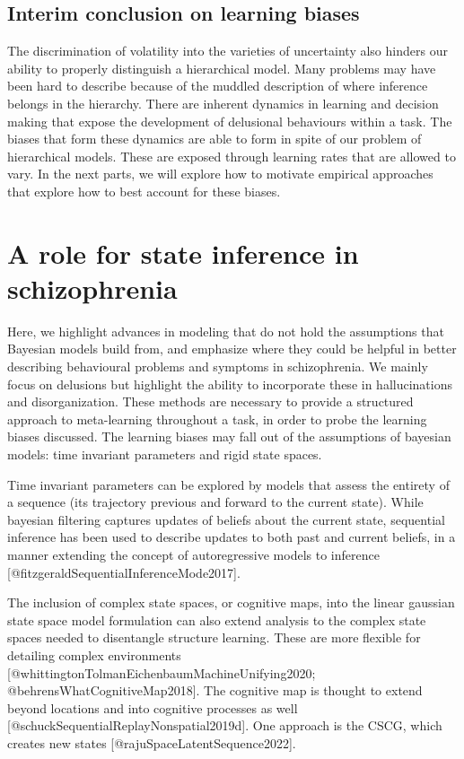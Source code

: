 \documentclass{article}
\begin{document}
\subsection{Interim conclusion on learning biases}

The discrimination of volatility into the varieties of uncertainty also hinders our ability to properly distinguish a hierarchical model. Many problems may have been hard to describe because of the muddled description of where inference belongs in the hierarchy. There are inherent dynamics in learning and decision making that expose the development of delusional behaviours within a task. The biases that form these dynamics are able to form in spite of our problem of hierarchical models. These are exposed through learning rates that are allowed to vary. In the next parts, we will explore how to motivate empirical approaches that explore how to best account for these biases.

\section{A role for state inference in schizophrenia}\label{state_inf}

Here, we highlight advances in modeling that do not hold the assumptions that Bayesian models build from, and emphasize where they could be helpful in better describing behavioural problems and symptoms in schizophrenia. We mainly focus on delusions but highlight the ability to incorporate these in hallucinations and disorganization. These methods are necessary to provide a structured approach to meta-learning throughout a task, in order to probe the learning biases discussed. The learning biases may fall out of the assumptions of bayesian models: time invariant parameters and rigid state spaces.

Time invariant parameters can be explored by models that assess the entirety of a sequence (its trajectory previous and forward to the current state). While bayesian filtering captures updates of beliefs about the current state, sequential inference has been used to describe updates to both past and current beliefs, in a manner extending the concept of autoregressive models to inference [@fitzgeraldSequentialInferenceMode2017].

The inclusion of complex state spaces, or cognitive maps, into the linear gaussian state space model formulation can also extend analysis to the complex state spaces needed to disentangle structure learning. These are more flexible for detailing complex environments [@whittingtonTolmanEichenbaumMachineUnifying2020; @behrensWhatCognitiveMap2018]. The cognitive map is thought to extend beyond locations and into cognitive processes as well [@schuckSequentialReplayNonspatial2019d]. One approach is the CSCG, which creates new states [@rajuSpaceLatentSequence2022].
\end{document}
